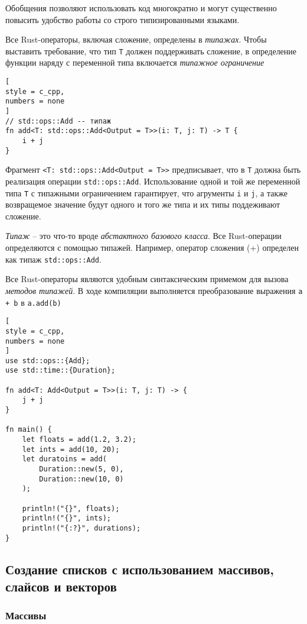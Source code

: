 \documentclass[%
	11pt,
	a4paper,
	utf8,
		]{article}
\begin{document}
Обобщения позволяют использовать код многократно и могут существенно повысить удобство работы со строго типизированными языками.

Все Rust-операторы, включая сложение, определены в \emph{типажах}. Чтобы выставить требование, что тип \texttt{T} должен поддерживать сложение, в определение функции наряду с переменной типа включается \emph{типажное ограничение}
\begin{lstlisting}[
style = c_cpp,
numbers = none
]
// std::ops::Add -- типаж
fn add<T: std::ops::Add<Output = T>>(i: T, j: T) -> T {
    i + j
}
\end{lstlisting}

Фрагмент \verb|<T: std::ops::Add<Output = T>>| предписывает, что в \texttt{T} должна быть реализация операции \verb|std::ops::Add|. Использование одной и той же переменной типа \texttt{T} с типажными ограничением гарантирует, что агрументы \texttt{i} и \texttt{j}, а также возвращемое значение будут одного и того же типа и их типы поддеживают сложение.

\emph{Типаж} -- это что-то вроде \emph{абстактного базового класса}. Все Rust-операции определяются с помощью типажей. Например, оператор сложения (+) определен как типаж \verb|std::ops::Add|.

Все Rust-операторы являются удобным синтаксическим примемом для вызова \emph{методов типажей}. В ходе компиляции выполняется преобразование выражения \verb*|a + b| в \verb|a.add(b)|
\begin{lstlisting}[
style = c_cpp,
numbers = none
]
use std::ops::{Add};
use std::time::{Duration};

fn add<T: Add<Output = T>>(i: T, j: T) -> {
    j + j
}

fn main() {
    let floats = add(1.2, 3.2);
    let ints = add(10, 20);
    let duratoins = add(
        Duration::new(5, 0),
        Duration::new(10, 0)
    );
    
    println!("{}", floats);
    println!("{}", ints);
    println!("{:?}", durations);
}
\end{lstlisting}

\subsection{Создание списков с использованием массивов, слайсов и векторов}

\subsubsection{Массивы}
\end{document}
